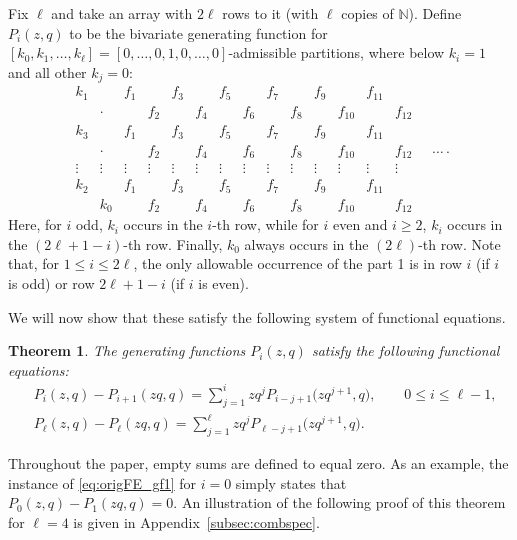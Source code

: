 \documentclass[10pt,a4paper]{amsart}
\numberwithin{equation}{section}
\newtheorem{Theorem}{Theorem}[section]
\theoremstyle{definition}
\newcommand{\NN}{\mathbb{N}}
\begin{document}
Fix $\ell$ and take an array with $2\ell$ rows to it (with $\ell$ copies of $\NN$). Define $P_i(z,q)$ to be the bivariate generating function for $[k_0,k_1,\dots,k_\ell]=[0,\dots,0,1,0,\dots,0]$-admissible partitions, where below $k_i=1$ and all other $k_j=0$:
\begin{equation*}
\begin{matrix}
k_1 && f_1 && f_3 && f_5 && f_7 && f_9 && f_{11} & \\
& \cdot && f_2 && f_4 && f_6 && f_8 && f_{10} && f_{12}\\
k_3 &&f_1 && f_3 && f_5 && f_7 && f_9 && f_{11} & \\
& \cdot && f_2 && f_4 && f_6 && f_8 && f_{10} && f_{12}\\
\vdots & \vdots &\vdots& \vdots &\vdots& \vdots &\vdots& \vdots &\vdots& \vdots &\vdots& \vdots&\vdots& \vdots\\
k_2 && f_1 && f_3 && f_5 && f_7 && f_9 && f_{11} & \\
& k_0 && f_2 && f_4 && f_6 && f_8 && f_{10} && f_{12}
 \end{matrix}\quad\dots\,.
\end{equation*}
Here, for $i$ odd, $k_i$ occurs in the $i$-th row, while for $i$ even and $i\ge 2$, $k_i$ occurs in the $(2\ell+1-i)$-th row. Finally, $k_0$ always occurs in the $(2\ell)$-th row. Note that, for $1 \le i \le 2\ell$, the only allowable occurrence of the part 1 is in row $i$ (if $i$ is odd) or row $2\ell+1-i$ (if $i$ is even).

We will now show that these satisfy the following system of functional equations.
\begin{Theorem} \label{thm:funceq1A}
The generating functions $P_i(z,q)$ satisfy the following functional equations:
\begin{align}
&P_i(z,q) - P_{i+1}(zq,q)= \sum_{j=1}^i zq^j P_{i-j+1}\bigl(zq^{j+1},q\bigr), \qquad 0 \le i \le \ell-1, \label{eq:origFE_gf1} \\
&P_\ell(z,q) - P_\ell(zq,q)= \sum_{j=1}^\ell zq^j P_{\ell-j+1}\bigl(zq^{j+1},q\bigr). \label{eq:origFE_gf2}
\end{align}
\end{Theorem}
Throughout the paper, empty sums are defined to equal zero. As an example, the instance of \eqref{eq:origFE_gf1} for $i=0$ simply states that $P_0(z,q)-P_1(zq,q)=0$. An illustration of the following proof of this theorem for $\ell=4$ is given in Appendix~\ref{subsec:combspec}.
\end{document}
